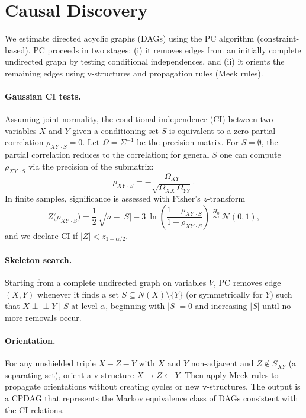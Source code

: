 \documentclass[11pt, a4paper]{article}
\begin{document}
\section{Causal Discovery}
We estimate directed acyclic graphs (DAGs) using the PC algorithm (constraint-based). PC proceeds in two stages: (i) it removes edges from an initially complete undirected graph by testing conditional independences, and (ii) it orients the remaining edges using v-structures and propagation rules (Meek rules).

\paragraph{Gaussian CI tests.}
Assuming joint normality, the conditional independence (CI) between two variables $X$ and $Y$ given a conditioning set $S$ is equivalent to a zero partial correlation $\rho_{XY\,\cdot S}=0$. Let $\Omega=\Sigma^{-1}$ be the precision matrix. For $S=\emptyset$, the partial correlation reduces to the correlation; for general $S$ one can compute $\rho_{XY\,\cdot S}$ via the precision of the submatrix:
\begin{equation}
  \rho_{XY\,\cdot S} 
  	= -\frac{\Omega_{XY}}{\sqrt{\Omega_{XX}\,\Omega_{YY}}}.
\end{equation}
In finite samples, significance is assessed with Fisher's $z$-transform
\begin{equation}
  Z\big(\rho_{XY\,\cdot S}\big)
  	= \frac{1}{2}\,\sqrt{n-|S|-3}\,\ln\!\left(\frac{1+\rho_{XY\,\cdot S}}{1-\rho_{XY\,\cdot S}}\right)
  \;\overset{H_0}{\sim}\; \mathcal{N}(0,1),
\end{equation}
and we declare CI if $|Z| < z_{1-\alpha/2}$.

\paragraph{Skeleton search.}
Starting from a complete undirected graph on variables $V$, PC removes edge $(X,Y)$ whenever it finds a set $S\subseteq N(X)\setminus\{Y\}$ (or symmetrically for $Y$) such that $X\perp\!\!\perp Y\mid S$ at level $\alpha$, beginning with $|S|=0$ and increasing $|S|$ until no more removals occur.

\paragraph{Orientation.}
For any unshielded triple $X\!\! -\! Z\! -\!\! Y$ with $X$ and $Y$ non-adjacent and $Z\notin S_{XY}$ (a separating set), orient a v-structure $X\to Z\leftarrow Y$. Then apply Meek rules to propagate orientations without creating cycles or new v-structures. The output is a CPDAG that represents the Markov equivalence class of DAGs consistent with the CI relations.
\end{document}
